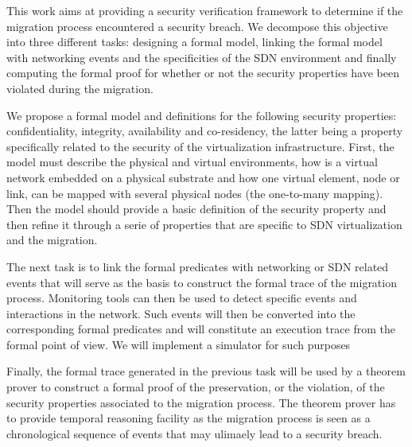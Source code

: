 This work aims at providing a security verification framework to determine if the migration process encountered a security breach.
We decompose this objective into three different tasks: designing a formal model, linking the formal model with networking events and the specificities of the SDN environment and finally computing the formal proof for whether or not the security properties have been violated during the migration.
 
We propose a formal model and definitions for the following security properties: confidentiality, integrity, availability 
and co-residency, the latter being a property specifically related to the security of the virtualization infrastructure. First, the model must describe the physical and virtual environments, how is a virtual network embedded on a physical substrate and how one virtual element, node or link, can be mapped with several physical nodes (\ie the one-to-many mapping).
Then the model should provide a basic definition of the security property and then refine it through a serie of properties that are specific to SDN virtualization and the migration.

The next task is to link the formal predicates with networking or SDN related events that will serve as the basis to construct the formal trace of the migration process.
Monitoring tools can then be used to detect specific events and interactions in the network. Such events will then be converted into the corresponding formal predicates and will constitute an execution trace from the formal point of view.
We will implement a simulator for such purposes

Finally, the formal trace generated in the previous task will be used by a theorem prover to construct a formal proof of the preservation, or the violation, of the security properties associated to the migration process. The theorem prover has to provide temporal reasoning facility as the migration process is seen as a chronological sequence of events that may ulimaely lead to a security breach.




